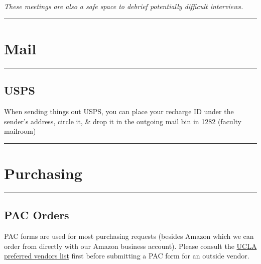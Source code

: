 \documentclass[]{book}
\begin{document}
\emph{These meetings are also a safe space to debrief potentially difficult interviews.}

\begin{center}\rule{0.5\linewidth}{\linethickness}\end{center}

\hypertarget{mail}{%
\section{Mail}\label{mail}}

\begin{center}\rule{0.5\linewidth}{\linethickness}\end{center}

\hypertarget{usps}{%
\subsection{USPS}\label{usps}}

When sending things out USPS, you can place your recharge ID under the sender's address, circle it, \& drop it in the outgoing mail bin in 1282 (faculty mailroom)

\begin{center}\rule{0.5\linewidth}{\linethickness}\end{center}

\hypertarget{purchasing}{%
\section{Purchasing}\label{purchasing}}

\begin{center}\rule{0.5\linewidth}{\linethickness}\end{center}

\hypertarget{pac-orders}{%
\subsection{PAC Orders}\label{pac-orders}}

PAC forms are used for most purchasing requests (besides Amazon which we can order from directly with our Amazon business account). Please consult the \href{http://staff.purchasing.ucla.edu/Portal/app/agreements/agreementsummary.aspx}{UCLA preferred vendors list} first before submitting a PAC form for an outside vendor.
\end{document}
